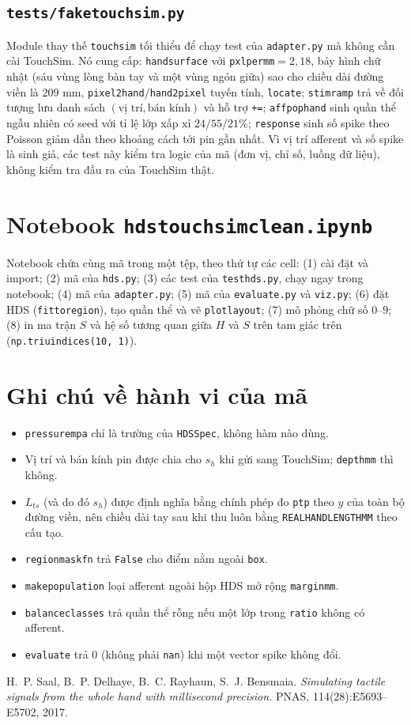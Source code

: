 \documentclass[11pt,a4paper]{article}
\renewcommand{\_}{\textunderscore\hspace{0pt}}
\newcommand{\code}[1]{\texttt{#1}}
\newcommand{\hs}{\ensuremath{s_h}}
\begin{document}
\subsection{\texttt{tests/fake\_touchsim.py}}
Module thay thế \code{touchsim} tối thiểu để chạy test của \code{adapter.py} mà không cần cài TouchSim. Nó cung cấp: \code{hand\_surface} với \code{pxl\_per\_mm}$=2{,}18$, bảy hình chữ nhật (sáu vùng lòng bàn tay và một vùng ngón giữa) sao cho chiều dài đường viền là $209$ mm, \code{pixel2hand}/\code{hand2pixel} tuyến tính, \code{locate}; \code{stim\_ramp} trả về đối tượng lưu danh sách $(\text{vị trí},\text{bán kính})$ và hỗ trợ \code{+=}; \code{affpop\_hand} sinh quần thể ngẫu nhiên có seed với tỉ lệ lớp xấp xỉ $24/55/21\%$; \code{response} sinh số spike theo Poisson giảm dần theo khoảng cách tới pin gần nhất. Vì vị trí afferent và số spike là sinh giả, các test này kiểm tra logic của mã (đơn vị, chỉ số, luồng dữ liệu), không kiểm tra đầu ra của TouchSim thật.

\section{Notebook \texttt{hds\_touchsim\_clean.ipynb}}
Notebook chứa cùng mã trong một tệp, theo thứ tự các cell: (1) cài đặt và import; (2) mã của \code{hds.py}; (3) các test của \code{test\_hds.py}, chạy ngay trong notebook; (4) mã của \code{adapter.py}; (5) mã của \code{evaluate.py} và \code{viz.py}; (6) đặt HDS (\code{fit\_to\_region}), tạo quần thể và vẽ \code{plot\_layout}; (7) mô phỏng chữ số $0$--$9$; (8) in ma trận $S$ và hệ số tương quan giữa $H$ và $S$ trên tam giác trên (\code{np.triu\_indices(10, 1)}).

\section{Ghi chú về hành vi của mã}
\begin{itemize}
\item \code{pressure\_mpa} chỉ là trường của \code{HDSSpec}, không hàm nào dùng.
\item Vị trí và bán kính pin được chia cho $\hs$ khi gửi sang TouchSim; \code{depth\_mm} thì không.
\item $L_{ts}$ (và do đó $\hs$) được định nghĩa bằng chính phép đo \code{ptp} theo $y$ của toàn bộ đường viền, nên chiều dài tay sau khi thu luôn bằng \code{REAL\_HAND\_LENGTH\_MM} theo cấu tạo.
\item \code{region\_mask\_fn} trả \code{False} cho điểm nằm ngoài \code{box}.
\item \code{make\_population} loại afferent ngoài hộp HDS mở rộng \code{margin\_mm}.
\item \code{balance\_classes} trả quần thể rỗng nếu một lớp trong \code{ratio} không có afferent.
\item \code{evaluate} trả $0$ (không phải \code{nan}) khi một vector spike không đổi.
\end{itemize}

\begin{thebibliography}{9}
 H.~P. Saal, B.~P. Delhaye, B.~C. Rayhaun, S.~J. Bensmaia. \emph{Simulating tactile signals from the whole hand with millisecond precision.} PNAS, 114(28):E5693--E5702, 2017.
\end{thebibliography}
\end{document}
